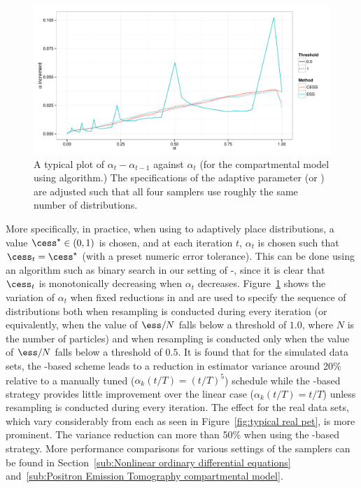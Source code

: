 \begin{figure}[t]
  \includegraphics[width=\linewidth]{fig/Adaptive_Dist}
  \caption[Variations of the distribution specification parameter for the
  \protect\pet compartmental model using adaptive \protect\smc algorithms]
  {A typical plot of $\alpha_t - \alpha_{t-1}$ against $\alpha_t$ (for the
    \pet compartmental model using \smc[2] algorithm.) The specifications of
    the adaptive parameter (\ess or \cess) are adjusted such that all four
    samplers use roughly the same number of distributions.}
  \label{fig:adaptive_alpha}
\end{figure}

More specifically, in practice, when using \cess to adaptively place
distributions, a value $\cess^\star \in (0, 1)$ is chosen, and at each
iteration $t$, $\alpha_t$ is chosen such that $\cess_t = \cess^\star$ (with a
preset numeric error tolerance). This can be done using an algorithm such as
binary search in our setting of \smc[1]-\smc[3], since it is clear that
$\cess_t$ is monotonically decreasing when $\alpha_t$ decreases.
Figure~\ref{fig:adaptive_alpha} shows the variation of $\alpha_t$ when fixed
reductions in \ess and \cess are used to specify the sequence of distributions
both when resampling is conducted during every iteration (or equivalently,
when the value of $\ess/N$ falls below a threshold of $1.0$, where $N$ is the
number of particles) and when resampling is conducted only when the value of
$\ess/N$ falls below a threshold of $0.5$. It is found that for the simulated
\pet data sets, the \cess-based scheme leads to a reduction in estimator
variance around 20\% relative to a manually tuned ($\alpha_k(t/T) = (t/T)^5$)
schedule while the \ess-based strategy provides little improvement over the
linear case ($\alpha_k(t/T) = t/T$) unless resampling is conducted during
every iteration. The effect for the real data sets, which vary considerably
from each as seen in Figure~\ref{fig:typical real pet}, is more prominent. The
variance reduction can more than 50\% when using the \cess-based strategy.
More performance comparisons for various settings of the samplers can be found
in Section~\ref{sub:Nonlinear ordinary differential equations}
and~\ref{sub:Positron Emission Tomography compartmental model}.

